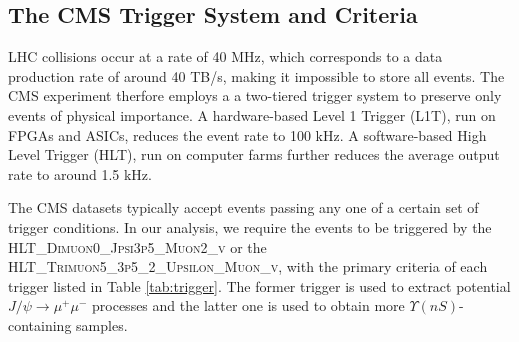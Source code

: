 \documentclass[10pt,twocolumn]{article}
\begin{document}
\subsection{The CMS Trigger System and Criteria}

LHC collisions occur at a rate of 40 MHz, which corresponds to a data production rate of around 40 TB/s, making it impossible to store all events. The CMS experiment therfore employs a a two-tiered trigger system to preserve only events of physical importance. A hardware-based Level 1 Trigger (L1T), run on FPGAs and ASICs, reduces the event rate to 100 kHz. A software-based High Level Trigger (HLT), run on computer farms further reduces the average output rate to around 1.5 kHz.

The CMS datasets typically accept events passing any one of a certain set of trigger conditions. In our analysis, we require the events to be triggered by the \textsc{HLT\_Dimuon0\_Jpsi3p5\_Muon2\_v} or the \textsc{HLT\_Trimuon5\_3p5\_2\_Upsilon\_Muon\_v}, with the primary criteria of each trigger listed in Table \ref{tab:trigger}. The former trigger is used to extract potential $J/\psi\to\mu^+\mu^-$ processes and the latter one is used to obtain more $\Upsilon(nS)$-containing samples.
\end{document}
